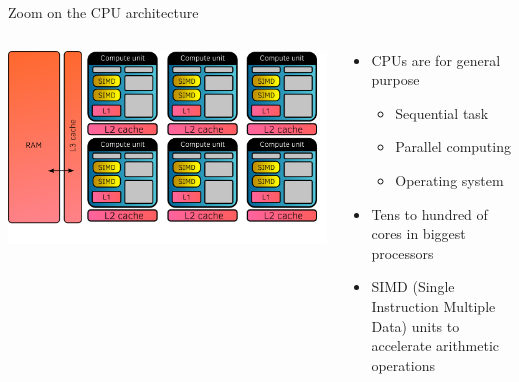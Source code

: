 \documentclass[aspectratio=169]{beamer}
\begin{document}
\begin{frame}{Zoom on the CPU architecture}
    \begin{columns}
        \begin{column}{0.5\linewidth}
            \begin{center}
                \includegraphics[width=\linewidth]{cpu_architecture.png}
            \end{center}
        \end{column}
        \begin{column}{0.5\linewidth}
            \begin{itemize}
                \item CPUs are for general purpose
                \begin{itemize}
                    \item Sequential task
                    \item Parallel computing
                    \item Operating system
                \end{itemize}
                \item Tens to hundred of cores in biggest processors
                \item SIMD (Single Instruction Multiple Data) units to accelerate arithmetic operations
            \end{itemize}
        \end{column}
    \end{columns}
\end{frame}

\end{document}
